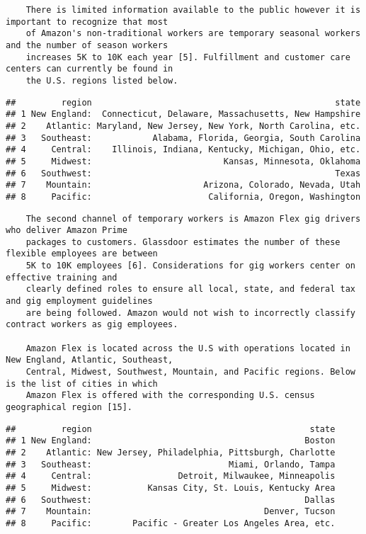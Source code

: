 \documentclass[]{article}
\begin{document}
\begin{verbatim}
    There is limited information available to the public however it is important to recognize that most
    of Amazon's non-traditional workers are temporary seasonal workers and the number of season workers
    increases 5K to 10K each year [5]. Fulfillment and customer care centers can currently be found in 
    the U.S. regions listed below.
\end{verbatim}

\begin{verbatim}
##         region                                                state
## 1 New England:  Connecticut, Delaware, Massachusetts, New Hampshire
## 2    Atlantic: Maryland, New Jersey, New York, North Carolina, etc.
## 3   Southeast:            Alabama, Florida, Georgia, South Carolina
## 4     Central:    Illinois, Indiana, Kentucky, Michigan, Ohio, etc.
## 5     Midwest:                          Kansas, Minnesota, Oklahoma
## 6   Southwest:                                                Texas
## 7    Mountain:                      Arizona, Colorado, Nevada, Utah
## 8     Pacific:                       California, Oregon, Washington
\end{verbatim}

\begin{verbatim}
    The second channel of temporary workers is Amazon Flex gig drivers who deliver Amazon Prime 
    packages to customers. Glassdoor estimates the number of these flexible employees are between 
    5K to 10K employees [6]. Considerations for gig workers center on effective training and 
    clearly defined roles to ensure all local, state, and federal tax and gig employment guidelines 
    are being followed. Amazon would not wish to incorrectly classify contract workers as gig employees.

    Amazon Flex is located across the U.S with operations located in New England, Atlantic, Southeast, 
    Central, Midwest, Southwest, Mountain, and Pacific regions. Below is the list of cities in which 
    Amazon Flex is offered with the corresponding U.S. census geographical region [15]. 
\end{verbatim}

\begin{verbatim}
##         region                                           state
## 1 New England:                                          Boston
## 2    Atlantic: New Jersey, Philadelphia, Pittsburgh, Charlotte
## 3   Southeast:                           Miami, Orlando, Tampa
## 4     Central:                 Detroit, Milwaukee, Minneapolis
## 5     Midwest:           Kansas City, St. Louis, Kentucky Area
## 6   Southwest:                                          Dallas
## 7    Mountain:                                  Denver, Tucson
## 8     Pacific:        Pacific - Greater Los Angeles Area, etc.
\end{verbatim}
\end{document}
